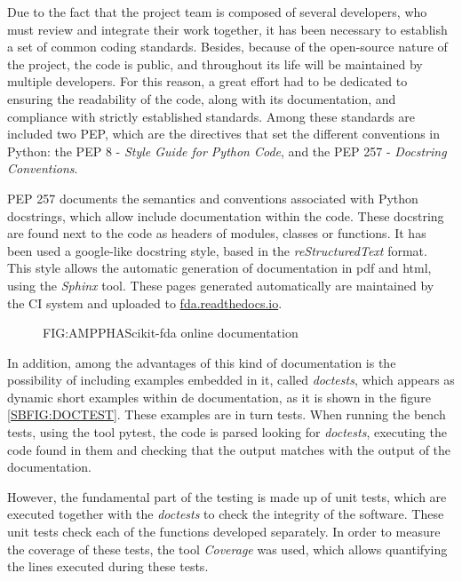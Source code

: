 

Due to the fact that the project team is composed of several developers, who
must review and integrate their work together, it has been necessary to
establish a set of common coding standards.
Besides, because of the open-source nature of the project, the code is
public, and throughout its life will be maintained by multiple developers. For
this reason, a great effort had to be dedicated to ensuring the readability of
the code, along with its documentation, and compliance with strictly established
standards. Among these standards are included two \ac{PEP}, which are the directives that set the different conventions in Python:
the \ac{PEP} 8 - \textit{Style Guide for Python Code}, and the \acs{PEP} 257 - \textit{Docstring Conventions}.

\acs{PEP} 257 documents the semantics and conventions associated with Python
docstrings, which allow include documentation within the code. These docstring
are found next to the code as headers of modules, classes or functions. It has
been used a google-like docstring style, based in the \textit{reStructuredText} format.
This style allows the automatic generation of documentation in pdf and html,
using the \textit{Sphinx} tool. These pages generated automatically are maintained by
the \ac{CI} system and uploaded to 
\href{https://fda.readthedocs.io/}{fda.readthedocs.io}.

\begin{figure}[Scikit-fda online documentation]{FIG:AMPPHA}{Scikit-fda online documentation}
   \quad
\end{figure}

In addition, among the advantages of this kind of documentation is the
possibility of including examples embedded in it, called \textit{doctests}, which appears
 as dynamic short examples within de documentation, as it is shown in the
 figure \ref{SBFIG:DOCTEST}.
These examples are in turn tests. When running the bench tests, using the tool
pytest, the code is parsed looking for \textit{doctests}, executing the code found in
them and checking that the output matches with the output of the documentation.

However, the fundamental part of the testing is made up of unit tests, which are
executed together with the \textit{doctests} to check the integrity of the software.
These unit tests check each of the functions developed separately. In order to measure the coverage of these tests, the tool \textit{Coverage} was used, which allows quantifying the lines executed during these tests.

